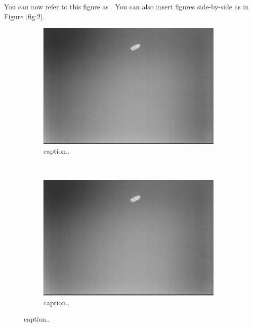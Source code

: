 You can now refer to this figure as . You can also insert figures side-by-side as in Figure \ref{fig:2}. %
\begin{figure}[ht]
	\centering
	\begin{subfigure}[b]{0.45\textwidth}
		\includegraphics[width=\textwidth]{fig1}
		\caption{caption..}
		\label{fig:2a}
	\end{subfigure}
	~ %
	\begin{subfigure}[b]{0.45\textwidth}
		\includegraphics[width=\textwidth]{fig1}
		\caption{caption..}
		\label{fig:2b}
	\end{subfigure}

\end{figure}

